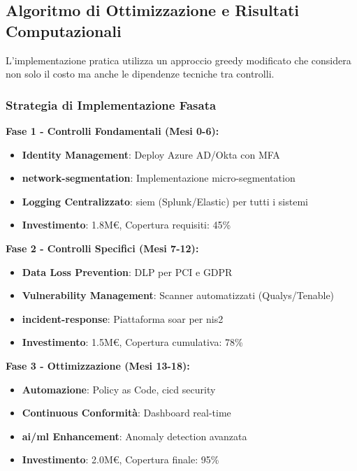 \subsection{\texorpdfstring{Algoritmo di Ottimizzazione e Risultati Computazionali}{4.3.2 - Algoritmo di Ottimizzazione e Risultati Computazionali}}

L'implementazione pratica utilizza un approccio greedy modificato che considera non solo il costo ma anche le dipendenze tecniche tra controlli\autocite{Chvatal1979}.

\subsubsection{\texorpdfstring{Strategia di Implementazione Fasata}{4.3.2.1 - Strategia di Implementazione Fasata}}

\textbf{Fase 1 - Controlli Fondamentali (Mesi 0-6):}
\begin{itemize}
    \item \textbf{Identity Management}: Deploy Azure AD/Okta con MFA
    \item \textbf{\gls{network-segmentation}}: Implementazione \gls{micro-segmentation}
    \item \textbf{Logging Centralizzato}: \gls{siem} (Splunk/Elastic) per tutti i sistemi
    \item \textbf{Investimento}: 1.8M€, Copertura requisiti: 45\%
\end{itemize}

\textbf{Fase 2 - Controlli Specifici (Mesi 7-12):}
\begin{itemize}
    \item \textbf{Data Loss Prevention}: DLP per PCI e GDPR
    \item \textbf{Vulnerability Management}: Scanner automatizzati (Qualys/Tenable)
    \item \textbf{\gls{incident-response}}: Piattaforma \gls{soar} per \gls{nis2}
    \item \textbf{Investimento}: 1.5M€, Copertura cumulativa: 78\%
\end{itemize}

\textbf{Fase 3 - Ottimizzazione (Mesi 13-18):}
\begin{itemize}
    \item \textbf{Automazione}: Policy as Code, \gls{cicd} security
    \item \textbf{Continuous Conformità}: Dashboard real-time
    \item \textbf{\gls{ai}/\gls{ml} Enhancement}: Anomaly detection avanzata
    \item \textbf{Investimento}: 2.0M€, Copertura finale: 95\%
\end{itemize}


